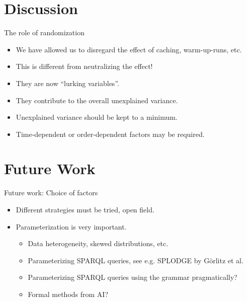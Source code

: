 \documentclass[english,usenames,dvipsnames,aspectratio=169]{beamer}
\begin{document}
\section{Discussion}

\begin{frame}{The role of randomization}
  \begin{itemize}
  \item We have allowed us to disregard the effect of caching,
    warm-up-runs, etc.
  \item This is different from neutralizing the effect!
  \item They are now ``lurking variables''.
  \item They contribute to the overall unexplained variance.
  \item Unexplained variance should be kept to a minimum.
  \item Time-dependent or order-dependent factors may be required.
  \end{itemize}
\end{frame}

\section{Future Work}

\begin{frame}{Future work: Choice of factors}

  \begin{itemize}
  \item Different strategies must be tried, open field.
  \item Parameterization is very important.
    \begin{itemize}
    \item Data heterogeneity, skewed distributions, etc.
    \item Parameterizing SPARQL queries, see e.g. SPLODGE by Görlitz
      et al.
    \item Parameterizing SPARQL queries using the grammar pragmatically?
    \item Formal methods from AI?
    \end{itemize}
  \end{itemize}
  
\end{frame}
\end{document}
